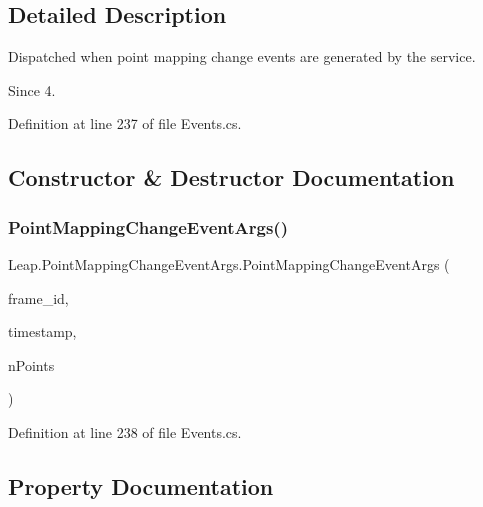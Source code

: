 \subsection{Detailed Description}
Dispatched when point mapping change events are generated by the service. 

\begin{DoxySince}{Since}
4. 
\end{DoxySince}


Definition at line 237 of file Events.\+cs.



\subsection{Constructor \& Destructor Documentation}
\mbox{\label{class_leap_1_1_point_mapping_change_event_args_a085441b330a5a5913c9be1939067bddf}} 
\subsubsection{\texorpdfstring{PointMappingChangeEventArgs()}{PointMappingChangeEventArgs()}}
{\footnotesize\ttfamily Leap.\+Point\+Mapping\+Change\+Event\+Args.\+Point\+Mapping\+Change\+Event\+Args (\begin{DoxyParamCaption}\item[{Int64}]{frame\+\_\+id,  }\item[{Int64}]{timestamp,  }\item[{U\+Int32}]{n\+Points }\end{DoxyParamCaption})}



Definition at line 238 of file Events.\+cs.



\subsection{Property Documentation}
\mbox{\label{class_leap_1_1_point_mapping_change_event_args_a42b7463e4dd8038f1c365a1fa069733a}} 
